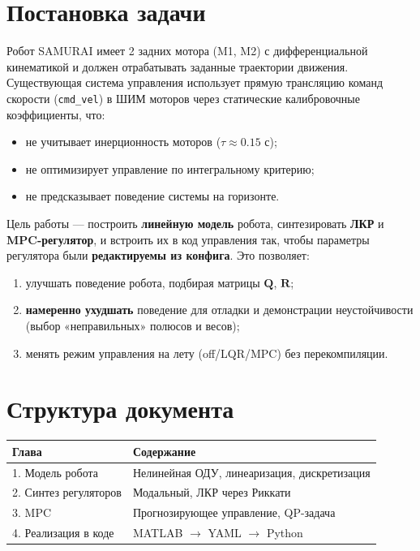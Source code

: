 \documentclass[12pt, a4paper, openany]{book}
\numberwithin{equation}{chapter}
\newcommand{\mat}[1]{\mathbf{#1}}
\begin{document}
\section*{Постановка задачи}

Робот SAMURAI имеет 2 задних мотора (M1, M2) с дифференциальной кинематикой
и должен отрабатывать заданные траектории движения. Существующая система
управления использует прямую трансляцию команд скорости (\texttt{cmd\_vel})
в ШИМ моторов через статические калибровочные коэффициенты, что:

\begin{itemize}
  \item не учитывает инерционность моторов ($\tau \approx 0.15$ с);
  \item не оптимизирует управление по интегральному критерию;
  \item не предсказывает поведение системы на горизонте.
\end{itemize}

Цель работы --- построить \textbf{линейную модель} робота, синтезировать
\textbf{ЛКР} и \textbf{MPC-регулятор}, и встроить их в код управления так,
чтобы параметры регулятора были \textbf{редактируемы из конфига}. Это
позволяет:

\begin{enumerate}
  \item улучшать поведение робота, подбирая матрицы $\mat{Q}$, $\mat{R}$;
  \item \textbf{намеренно ухудшать} поведение для отладки и демонстрации
        неустойчивости (выбор «неправильных» полюсов и весов);
  \item менять режим управления на лету (off/LQR/MPC) без перекомпиляции.
\end{enumerate}

\section*{Структура документа}

\begin{center}
\begin{tabular}{ll}
\toprule
\textbf{Глава} & \textbf{Содержание}\\
\midrule
1. Модель робота & Нелинейная ОДУ, линеаризация, дискретизация\\
2. Синтез регуляторов & Модальный, ЛКР через Риккати\\
3. MPC & Прогнозирующее управление, QP-задача\\
4. Реализация в коде & MATLAB $\to$ YAML $\to$ Python\\
\bottomrule
\end{tabular}
\end{center}
\end{document}
